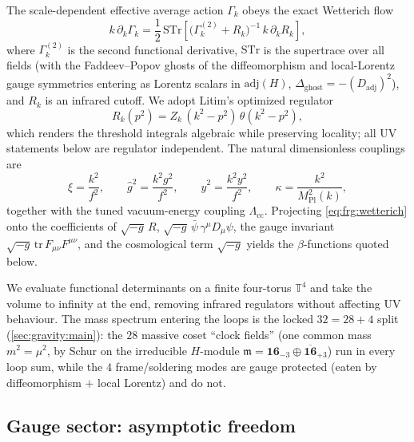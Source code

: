 The scale-dependent effective average action $\Gamma_{k}$ obeys the exact
Wetterich flow
\begin{equation}\label{eq:frg:wetterich}
  k\,\partial_{k}\Gamma_{k}
  =\frac12\,\mathrm{STr}\!\left[
    \bigl(\Gamma_{k}^{(2)}+R_{k}\bigr)^{-1}\,k\,\partial_{k}R_{k}\right],
\end{equation}
where $\Gamma_{k}^{(2)}$ is the second functional derivative, $\mathrm{STr}$
is the supertrace over all fields (with the Faddeev--Popov ghosts of the
diffeomorphism and local-Lorentz gauge symmetries entering as Lorentz
scalars in $\mathrm{adj}(H)$, $\Delta_{\mathrm{ghost}}=-(D_{\mathrm{adj}})^{2}$),
and $R_{k}$ is an infrared cutoff. We adopt Litim's optimized regulator
\begin{equation}\label{eq:frg:litim}
  R_{k}(p^{2})=Z_{k}\,(k^{2}-p^{2})\,\theta(k^{2}-p^{2}),
\end{equation}
which renders the threshold integrals algebraic while preserving locality;
all UV statements below are regulator independent. The natural
dimensionless couplings are
\begin{equation}\label{eq:frg:couplings}
  \xi=\frac{k^{2}}{f^{2}},\qquad
  \hat g^{2}=\frac{k^{2}g^{2}}{f^{2}},\qquad
  \hat y^{2}=\frac{k^{2}y^{2}}{f^{2}},\qquad
  \kappa=\frac{k^{2}}{M_{\mathrm{Pl}}^{2}(k)},
\end{equation}
together with the tuned vacuum-energy coupling $\Lambda_{\mathrm{cc}}$.
Projecting \eqref{eq:frg:wetterich} onto the coefficients of
$\sqrt{-g}\,R$, $\sqrt{-g}\,\bar\psi\,\gamma^{\mu}D_{\mu}\psi$, the gauge
invariant $\sqrt{-g}\,\mathrm{tr}\,F_{\mu\nu}F^{\mu\nu}$, and the cosmological
term $\sqrt{-g}$ yields the $\beta$-functions quoted below.

\begin{remark}
We evaluate functional determinants on a finite four-torus $\mathbb{T}^{4}$
and take the volume to infinity at the end, removing infrared regulators
without affecting UV behaviour. The mass spectrum entering the loops is the
locked $32=28+4$ split (\autoref{sec:gravity:main}): the $28$ massive coset
``clock fields'' (one common mass $m^{2}=\mu^{2}$, by Schur on the
irreducible $H$-module $\mathfrak{m}=\mathbf{16}_{-3}\oplus\overline{\mathbf{16}}_{+3}$)
run in every loop sum, while the $4$ frame/soldering modes are gauge
protected (eaten by diffeomorphism $+$ local Lorentz) and do not.
\end{remark}

\subsection{Gauge sector: asymptotic freedom}
\label{sec:frg:gauge}

